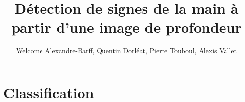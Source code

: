 \documentclass{article}
\title{Détection de signes de la main à partir d'une image de profondeur}
\author{Welcome Alexandre-Barff, Quentin Dorléat, Pierre Touboul, Alexis Vallet}
\begin{document}
\maketitle
\tableofcontents









\section{Classification}














\end{document}
